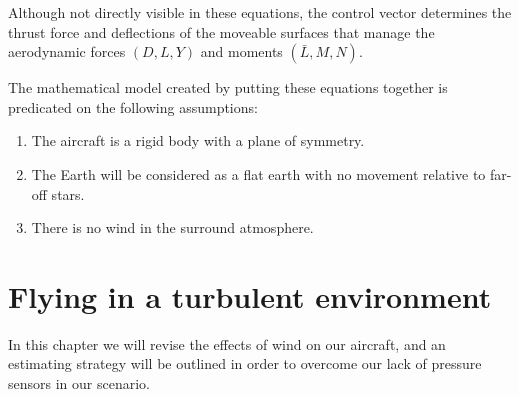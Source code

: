 \documentclass[twocolumn,showpacs,
    nofootinbib,aps,superscriptaddress,
    eqsecnum,prd,showkeys,10pt,floatfix]{revtex4}
\begin{document}
Although not directly visible in these equations, the control vector determines the thrust force and deflections of the moveable surfaces that manage the aerodynamic forces ${(D, L, Y)}$ and moments ${(\bar{L},  M,  N)}$.
\par
The mathematical model created by putting these equations together is
predicated on the following assumptions:
\par
\begin{enumerate}
    \item The aircraft is a rigid body with a plane of symmetry.
    \item The Earth will be considered as a flat earth with no movement relative to
          far-off stars.
    \item There is no wind in the surround atmosphere.
\end{enumerate}

\section{Flying in a turbulent environment}
In this chapter we will revise the effects of wind on our aircraft, and an
estimating strategy will be outlined in order to overcome our lack of pressure
sensors in our scenario.

\end{document}
